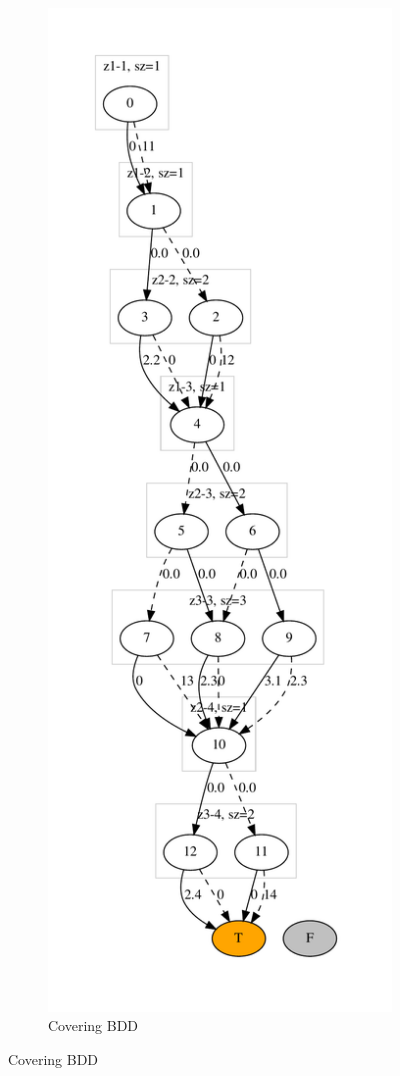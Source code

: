 \documentclass[11pt]{article}
\begin{document}
\begin{figure}[t!]
  \begin{subfigure}[t]{0.45\textwidth}
    \includegraphics[height=\textheight]{./covering.dot.pdf}
    \caption{Covering BDD}\label{fig:cover}

\end{subfigure}
\end{figure}
\end{document}
